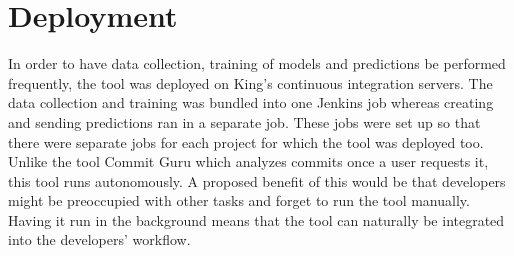 \documentclass[../main.tex]{subfiles}
\begin{document}
\section{Deployment}

In order to have data collection, training of models and predictions be performed frequently, the tool was deployed on King's continuous integration servers. The data collection and training was bundled into one Jenkins job whereas creating and sending predictions ran in a separate job. These jobs were set up so that there were separate jobs for each project for which the tool was deployed too. Unlike the tool Commit Guru which analyzes commits once a user requests it, this tool runs autonomously. A proposed benefit of this would be that developers might be preoccupied with other tasks and forget to run the tool manually. Having it run in the background means that the tool can naturally be integrated into the developers' workflow. 
\end{document}
